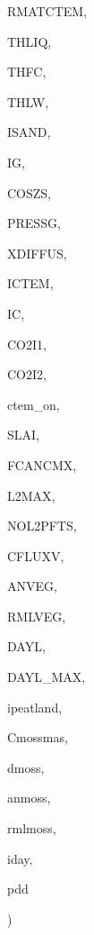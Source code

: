 {\begin{DoxyParamCaption}
\item[{real, dimension(ilg,ictem,ig)}]{R\+M\+A\+T\+C\+T\+E\+M, }
\item[{real, dimension(ilg,ig)}]{T\+H\+L\+I\+Q, }
\item[{real, dimension(ilg,ig)}]{T\+H\+F\+C, }
\item[{real, dimension(ilg,ig)}]{T\+H\+L\+W, }
\item[{integer, dimension(ilg,ig)}]{I\+S\+A\+N\+D, }
\item[{integer}]{I\+G, }
\item[{real, dimension(ilg)}]{C\+O\+S\+Z\+S, }
\item[{real, dimension(ilg)}]{P\+R\+E\+S\+S\+G, }
\item[{real, dimension(ilg)}]{X\+D\+I\+F\+F\+U\+S, }
\item[{integer}]{I\+C\+T\+E\+M, }
\item[{integer}]{I\+C, }
\item[{real, dimension(ilg,ictem)}]{C\+O2\+I1, }
\item[{real, dimension(ilg,ictem)}]{C\+O2\+I2, }
\item[{logical}]{ctem\+\_\+on, }
\item[{real, dimension(ilg,ictem)}]{S\+L\+A\+I, }
\item[{real, dimension(ilg,ictem)}]{F\+C\+A\+N\+C\+M\+X, }
\item[{integer}]{L2\+M\+A\+X, }
\item[{integer, dimension(ic)}]{N\+O\+L2\+P\+F\+T\+S, }
\item[{real, dimension(ilg)}]{C\+F\+L\+U\+X\+V, }
\item[{real, dimension(ilg,ictem)}]{A\+N\+V\+E\+G, }
\item[{real, dimension(ilg,ictem)}]{R\+M\+L\+V\+E\+G, }
\item[{real, dimension(ilg)}]{D\+A\+Y\+L, }
\item[{real, dimension(ilg)}]{D\+A\+Y\+L\+\_\+\+M\+A\+X, }
\item[{integer, dimension(ilg)}]{ipeatland, }
\item[{real, dimension(ilg)}]{Cmossmas, }
\item[{real, dimension(ilg)}]{dmoss, }
\item[{real, dimension(ilg)}]{anmoss, }
\item[{real, dimension(ilg)}]{rmlmoss, }
\item[{integer}]{iday, }
\item[{real, dimension(ilg)}]{pdd}
\end{DoxyParamCaption}
)}\label{TSOLVC_8f_a824dab26436ace6ad8f0f9e2f6908ce2}

